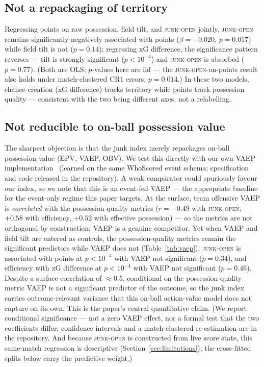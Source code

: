\documentclass[11pt]{article}
\newcommand{\junk}{\textsc{junk-open}}
\begin{document}
\subsection{Not a repackaging of territory}
\label{sec:partial}
Regressing points on raw possession, field tilt, and \junk{} jointly, \junk{}
remains significantly negatively associated with points ($\beta=-0.020$,
$p=0.017$) while field tilt is not ($p=0.14$); regressing xG difference, the
significance pattern reverses --- tilt is strongly significant ($p<10^{-4}$) and
\junk{} is absorbed ($p=0.77$). (Both are OLS; $p$-values here are iid ---
the \junk{}-on-points result also holds under match-clustered CR1 errors,
$p=0.014$.) In these two models, chance-creation (xG
difference) tracks territory while points track possession quality
--- consistent with the two being different axes, not a relabelling.

\subsection{Not reducible to on-ball possession value}
\label{sec:vaep}
The sharpest objection is that the junk index merely repackages on-ball
possession value (EPV, VAEP, OBV). We test this directly with our own VAEP
implementation~\citep{decroos2019actions} (learned on the same WhoScored event
schema; specification and code released in the repository). A weak comparator
could spuriously favour our index, so we note that this is an event-fed VAEP ---
the appropriate baseline for the event-only regime this paper targets. At
the surface, team offensive VAEP is \emph{correlated} with the possession-quality
metrics ($r=-0.49$ with \junk{}, $+0.58$ with efficiency, $+0.52$ with
effective possession) --- so the metrics are not orthogonal by construction;
VAEP is a genuine competitor. Yet when VAEP and field tilt are entered as
controls, the possession-quality metrics remain the significant predictors
while VAEP does not (Table~\ref{tab:vaep}): \junk{} is associated with points at
$p<10^{-4}$ with VAEP not significant ($p=0.34$), and efficiency with xG
difference at $p<10^{-4}$ with VAEP not significant ($p=0.46$). Despite a surface
correlation of $\approx0.5$, conditional on the possession-quality metric VAEP
is not a significant predictor of the outcome, so the junk index carries
outcome-relevant variance that this on-ball action-value model does not capture
on its own. This is the paper's central quantitative claim. (We report
conditional significance --- not a zero VAEP effect, nor a formal test that the
two coefficients differ; confidence intervals and a match-clustered
re-estimation are in the repository. And because \junk{} is constructed from
live score state, this same-match regression is descriptive
(Section~\ref{sec:limitations}); the cross-fitted splits below carry the
predictive weight.)
\end{document}
